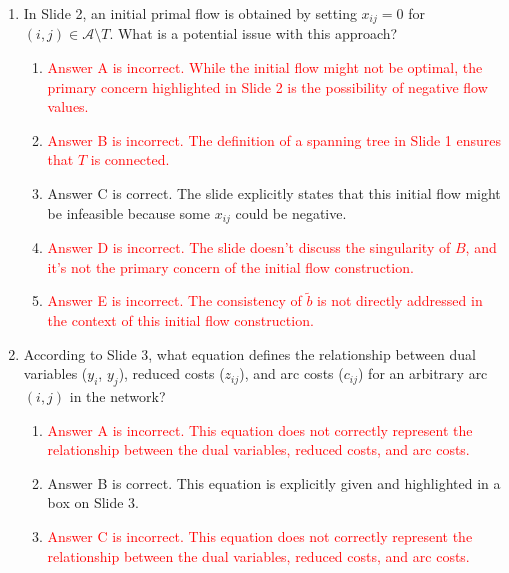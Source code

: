 \documentclass{article}%
\newcommand{\incorrect}[1]{\textcolor{red}{#1}}
\begin{document}
\begin{enumerate}
\begin{enumerate}
\item \incorrect{While the methods aim to improve primal and dual feasibility, respectively, the arc selection rules are not identical.}%
\item \incorrect{Incorrect. Both methods utilize the concept of a spanning tree, although they handle it differently.}%
\item \incorrect{Incorrect. The selection of entering and leaving arcs is deterministic and follows specific rules in both methods.}%
\end{enumerate}%
\vspace{1em}%
\item In Slide 2, an initial primal flow is obtained by setting $x_{ij} = 0$ for $(i, j) \in \mathcal{A} \setminus T$. What is a potential issue with this approach?%
\begin{enumerate}%
\item \incorrect{Answer A is incorrect. While the initial flow might not be optimal, the primary concern highlighted in Slide 2 is the possibility of negative flow values.}%
\item \incorrect{Answer B is incorrect. The definition of a spanning tree in Slide 1 ensures that $T$ is connected.}%
\item Answer C is correct.  The slide explicitly states that this initial flow might be infeasible because some $x_{ij}$ could be negative.%
\item \incorrect{Answer D is incorrect.  The slide doesn't discuss the singularity of $B$, and it's not the primary concern of the initial flow construction.}%
\item \incorrect{Answer E is incorrect. The consistency of $\tilde{b}$ is not directly addressed in the context of this initial flow construction.}%
\end{enumerate}%
\vspace{1em}%
\item According to Slide 3, what equation defines the relationship between dual variables ($y_i$, $y_j$), reduced costs ($z_{ij}$), and arc costs ($c_{ij}$) for an arbitrary arc $(i, j)$ in the network?%
\begin{enumerate}%
\item \incorrect{Answer A is incorrect. This equation does not correctly represent the relationship between the dual variables, reduced costs, and arc costs.}%
\item Answer B is correct. This equation is explicitly given and highlighted in a box on Slide 3.%
\item \incorrect{Answer C is incorrect. This equation does not correctly represent the relationship between the dual variables, reduced costs, and arc costs.}%

\end{enumerate}
\end{enumerate}
\end{document}
